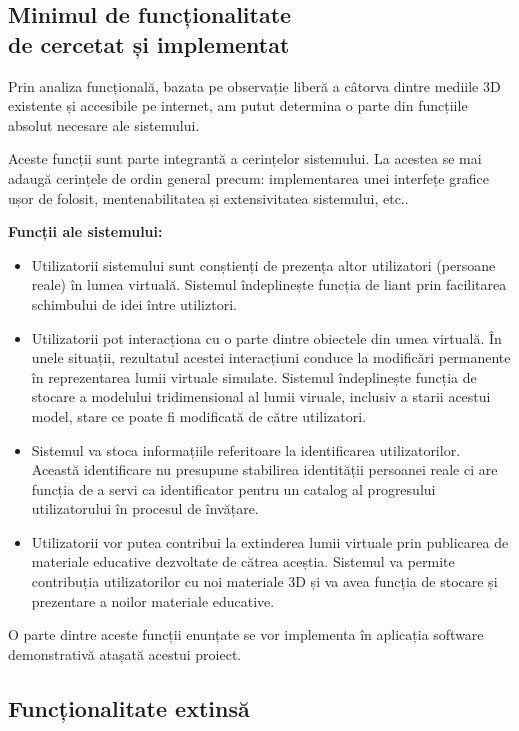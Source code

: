 \subsection{Minimul de funcționalitate \\ de cercetat și implementat}
\par Prin analiza funcțională, bazata pe observație liberă a câtorva dintre mediile 3D existente și accesibile pe internet, am putut determina  o parte din funcțiile absolut necesare ale sistemului.
\par Aceste funcții sunt parte integrantă a cerințelor sistemului. La acestea se mai adaugă cerințele de ordin general precum: implementarea unei interfețe grafice ușor de folosit, mentenabilitatea și extensivitatea sistemului, etc.. \\
\par \textbf{Funcții ale sistemului:}
\begin{itemize}
\item Utilizatorii sistemului sunt conștienți de prezența altor utilizatori (persoane reale) în lumea virtuală. Sistemul îndeplinește funcția de liant prin facilitarea schimbului de idei între utiliztori.
\item Utilizatorii pot interacționa cu o parte dintre obiectele din umea virtuală. În unele situații, rezultatul acestei interacțiuni conduce la modificări permanente în reprezentarea lumii virtuale simulate. Sistemul îndeplinește funcția de stocare a modelului tridimensional al lumii viruale, inclusiv a starii acestui model, stare ce poate fi modificată de către utilizatori.
\item Sistemul va stoca informațiile referitoare la identificarea utilizatorilor. Această identificare nu presupune stabilirea identității persoanei reale ci are funcția de a servi ca identificator pentru un catalog al progresului utilizatorului în procesul de învățare.
\item Utilizatorii vor putea contribui la extinderea lumii virtuale prin publicarea de materiale educative dezvoltate de cătrea aceștia. Sistemul va permite contribuția utilizatorilor cu noi materiale 3D și va avea funcția de stocare și prezentare a noilor materiale educative.
\end{itemize}

\par O parte dintre aceste funcții enunțate se vor implementa în aplicația software demonstrativă atașată acestui proiect.

\subsection{Funcționalitate extinsă}

